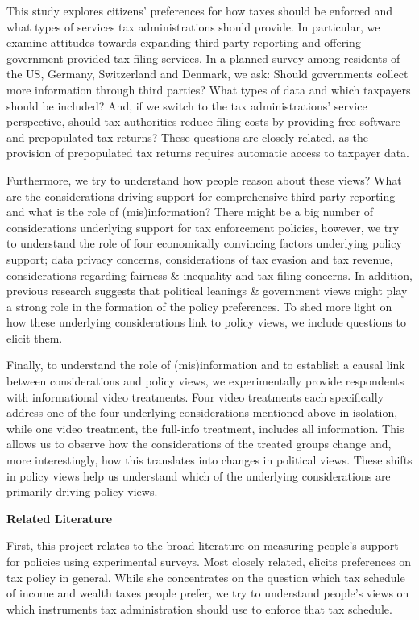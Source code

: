 \documentclass[12pt]{article}
\begin{document}
This study explores citizens' preferences for how taxes should be enforced and what types of services tax administrations should provide. In particular, we examine attitudes towards expanding third-party reporting and offering government-provided tax filing services. In a planned survey among residents of the US, Germany, Switzerland and Denmark, we ask: Should governments collect more information through third parties? What types of data and which taxpayers should be included? And, if we switch to the tax administrations' service perspective, should tax authorities reduce filing costs by providing free software and prepopulated tax returns? These questions are closely related, as the provision of prepopulated tax returns requires automatic access to taxpayer data.

Furthermore, we try to understand how people reason about these views? What are the considerations driving support for comprehensive third party reporting and what is the role of (mis)information? There might be a big number of considerations underlying support for tax enforcement policies, however, we try to understand the role of four economically convincing factors underlying policy support; data privacy concerns, considerations of tax evasion and tax revenue, considerations regarding fairness \& inequality and tax filing concerns. In addition, previous research suggests that political leanings \& government views might play a strong role in the formation of the policy preferences. To shed more light on how these underlying considerations link to policy views, we include questions to elicit them. 

Finally, to understand the role of (mis)information and to establish a causal link between considerations and policy views, we experimentally provide respondents with informational video treatments. Four video treatments each specifically address one of the four underlying considerations mentioned above in isolation, while one video treatment, the full-info treatment, includes all information. This allows us to observe how the considerations of the treated groups change and, more interestingly, how this translates into changes in political views. These shifts in policy views help us understand which of the underlying considerations are primarily driving policy views. \\[-1.5em]
\begin{center}
\textbf{Related Literature}
\end{center} 
First, this project relates to the broad literature on measuring people's support for policies using experimental surveys. Most closely related, \textcite{stantcheva2021understanding} elicits preferences on tax policy in general. While she concentrates on the question which tax schedule of income and wealth taxes people prefer, we try to understand people's views on which instruments tax administration should use to enforce that tax schedule. 
\end{document}
